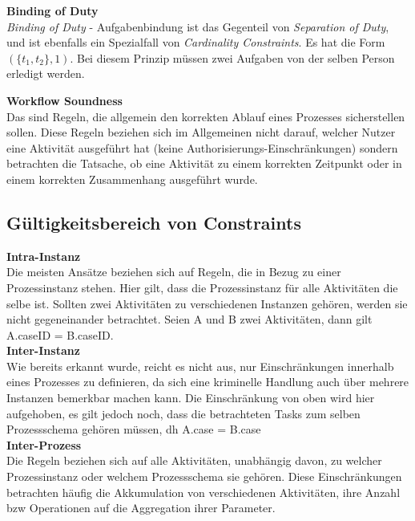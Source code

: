 \textbf{Binding of Duty}\\
\textit{Binding of Duty} - Aufgabenbindung ist das Gegenteil von \textit{Separation of Duty}, und ist ebenfalls ein Spezialfall von \textit{Cardinality Constraints}. Es hat die Form $(\{t_1,t_2\},1)$. Bei diesem Prinzip müssen zwei Aufgaben von der selben Person erledigt werden.


\textbf{Workflow Soundness}\\
Das sind Regeln, die allgemein den korrekten Ablauf eines Prozesses sicherstellen sollen. Diese Regeln beziehen sich im Allgemeinen nicht darauf, welcher Nutzer eine Aktivität ausgeführt hat (keine Authorisierungs-Einschränkungen) sondern betrachten die Tatsache, ob eine Aktivität zu einem korrekten Zeitpunkt oder in einem korrekten Zusammenhang ausgeführt wurde.

\subsection{Gültigkeitsbereich von Constraints}
\label{sec:rulecontext}
\textbf{Intra-Instanz}\\
Die meisten Ansätze beziehen sich auf Regeln, die in Bezug zu einer Prozessinstanz stehen. Hier gilt, dass die Prozessinstanz für alle Aktivitäten die selbe ist. Sollten zwei Aktivitäten zu verschiedenen Instanzen gehören, werden sie nicht gegeneinander betrachtet. Seien A und B zwei Aktivitäten, dann gilt A.caseID = B.caseID. 
\\
\textbf{Inter-Instanz}\\
Wie bereits erkannt wurde, reicht es nicht aus, nur Einschränkungen innerhalb eines Prozesses zu definieren, da sich eine kriminelle Handlung auch über mehrere Instanzen bemerkbar machen kann. Die Einschränkung von oben wird hier aufgehoben, es gilt jedoch noch, dass die betrachteten Tasks zum selben Prozessschema gehören müssen, dh A.case = B.case
\\
\textbf{Inter-Prozess}\\
Die Regeln beziehen sich auf alle Aktivitäten, unabhängig davon, zu welcher Prozessinstanz oder welchem Prozessschema sie gehören. Diese Einschränkungen betrachten häufig die Akkumulation von verschiedenen Aktivitäten, ihre Anzahl bzw Operationen auf die Aggregation ihrer Parameter.

